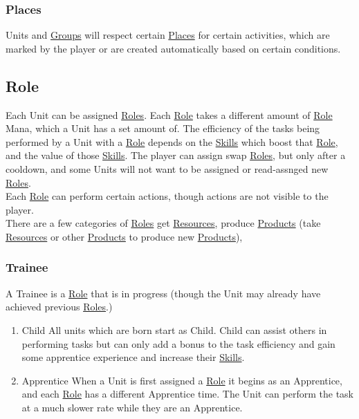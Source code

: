\documentclass[11pt]{article}
\begin{document}
\subsubsection{Places \label{org6741c08} \label{orgb5c5154}}
\label{sec:orga4c8225}
Units and \hyperref[org21e4d88]{Groups} will respect certain \hyperref[org6741c08]{Places} for certain activities, which are marked by the player or are created automatically based on certain conditions.\\
\subsection{Role \label{orgada42dd} \label{org080bb13}}
\label{sec:org0f3a315}
Each Unit can be assigned \hyperref[org080bb13]{Roles}. Each \hyperref[orgada42dd]{Role} takes a different amount of \hyperref[orgada42dd]{Role} Mana, which a Unit has a set amount of. The efficiency of the tasks being performed by a Unit with a \hyperref[orgada42dd]{Role} depends on the \hyperref[org58ad070]{Skills} which boost that \hyperref[orgada42dd]{Role}, and the value of those \hyperref[org58ad070]{Skills}. The player can assign swap \hyperref[org080bb13]{Roles}, but only after a cooldown, and some Units will not want to be assigned or read-assnged new \hyperref[org080bb13]{Roles}.\\

Each \hyperref[orgada42dd]{Role} can perform certain actions, though actions are not visible to the player.\\

There are a few categories of \hyperref[org080bb13]{Roles} get \hyperref[orgd69054e]{Resources}, produce \hyperref[orgc5e54a9]{Products} (take \hyperref[orgd69054e]{Resources} or other \hyperref[orgc5e54a9]{Products} to produce new \hyperref[orgc5e54a9]{Products}),\\
\subsubsection{Trainee}
\label{sec:org4cc58f0}
A Trainee is a \hyperref[orgada42dd]{Role} that is in progress (though the Unit may already have achieved previous \hyperref[org080bb13]{Roles}.)\\
\begin{enumerate}
\item Child
\label{sec:org2ac0e1a}
All units which are born start as Child. Child can assist others in performing tasks but can only add a bonus to the task efficiency and gain some apprentice experience and increase their \hyperref[org58ad070]{Skills}.\\
\item Apprentice
\label{sec:orgdb7f832}
When a Unit is first assigned a \hyperref[orgada42dd]{Role} it begins as an Apprentice, and each \hyperref[orgada42dd]{Role} has a different Apprentice time. The Unit can perform the task at a much slower rate while they are an Apprentice.\\
\end{enumerate}
\end{document}
